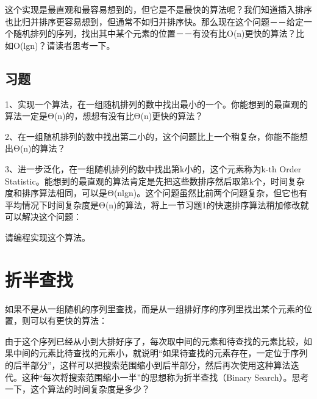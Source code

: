 

这个实现是最直观和最容易想到的，但它是不是最快的算法呢？我们知道插入排序也比归并排序更容易想到，但通常不如归并排序快。那么现在这个问题－－给定一个随机排列的序列，找出其中某个元素的位置－－有没有比O(n)更快的算法？比如O(lgn)？请读者思考一下。


\subsection*{习题}
%


1、实现一个算法，在一组随机排列的数中找出最小的一个。你能想到的最直观的算法一定是Θ(n)的，想想有没有比Θ(n)更快的算法？



2、在一组随机排列的数中找出第二小的，这个问题比上一个稍复杂，你能不能想出Θ(n)的算法？



3、进一步泛化，在一组随机排列的数中找出第k小的，这个元素称为k-th Order Statistic。能想到的最直观的算法肯定是先把这些数排序然后取第k个，时间复杂度和排序算法相同，可以是Θ(nlgn)。这个问题虽然比前两个问题复杂，但它也有平均情况下时间复杂度是Θ(n)的算法，将上一节习题1的快速排序算法稍加修改就可以解决这个问题：




请编程实现这个算法。




\section{折半查找}
%
如果不是从一组随机的序列里查找，而是从一组排好序的序列里找出某个元素的位置，则可以有更快的算法：





由于这个序列已经从小到大排好序了，每次取中间的元素和待查找的元素比较，如果中间的元素比待查找的元素小，就说明“如果待查找的元素存在，一定位于序列的后半部分”，这样可以把搜索范围缩小到后半部分，然后再次使用这种算法迭代。这种“每次将搜索范围缩小一半”的思想称为折半查找（Binary Search）。思考一下，这个算法的时间复杂度是多少？



